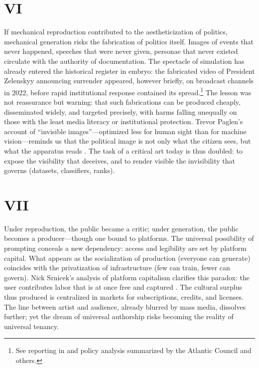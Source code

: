 \documentclass[12pt]{article}
\begin{document}
\section*{VI}

If mechanical reproduction contributed to the aestheticization of politics, mechanical generation risks the fabrication of politics itself. Images of events that never happened, speeches that were never given, personae that never existed circulate with the authority of documentation. The spectacle of simulation has already entered the historical register in embryo: the fabricated video of President Zelenskyy announcing surrender appeared, however briefly, on broadcast channels in 2022, before rapid institutional response contained its spread.\footnote{See reporting in \autocite{Wired2022} and policy analysis summarized by the Atlantic Council and others.} The lesson was not reassurance but warning: that such fabrications can be produced cheaply, disseminated widely, and targeted precisely, with harms falling unequally on those with the least media literacy or institutional protection. Trevor Paglen's account of ``invisible images''---optimized less for human sight than for machine vision---reminds us that the political image is not only what the citizen sees, but what the apparatus reads \autocite{Paglen2016}. The task of a critical art today is thus doubled: to expose the visibility that deceives, and to render visible the invisibility that governs (datasets, classifiers, ranks).

\section*{VII}

Under reproduction, the public became a critic; under generation, the public becomes a producer---though one bound to platforms. The universal possibility of prompting conceals a new dependency: access and legibility are set by platform capital. What appears as the socialization of production (everyone can generate) coincides with the privatization of infrastructure (few can train, fewer can govern). Nick Srnicek's analysis of platform capitalism clarifies this paradox: the user contributes labor that is at once free and captured \autocite{Srnicek2016}. The cultural surplus thus produced is centralized in markets for subscriptions, credits, and licenses. The line between artist and audience, already blurred by mass media, dissolves further; yet the dream of universal authorship risks becoming the reality of universal tenancy.
\end{document}

